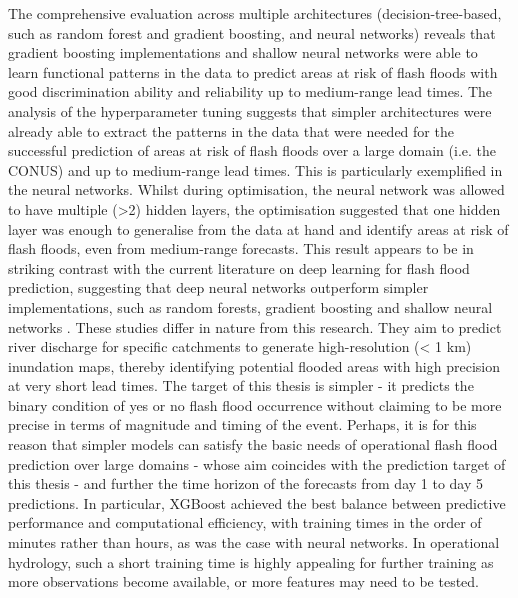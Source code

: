 The comprehensive evaluation across multiple architectures (decision-tree-based, such as random forest and gradient boosting, and neural networks) reveals that gradient boosting implementations and shallow neural networks were able to learn functional patterns in the data to predict areas at risk of flash floods with good discrimination ability and reliability up to medium-range lead times. The analysis of the hyperparameter tuning suggests that simpler architectures were already able to extract the patterns in the data that were needed for the successful prediction of areas at risk of flash floods over a large domain (i.e. the CONUS) and up to medium-range lead times. This is particularly exemplified in the neural networks. Whilst during optimisation, the neural network was allowed to have multiple (>2) hidden layers, the optimisation suggested that one hidden layer was enough to generalise from the data at hand and identify areas at risk of flash floods, even from medium-range forecasts. This result appears to be in striking contrast with the current literature on deep learning for flash flood prediction, suggesting that deep neural networks outperform simpler implementations, such as random forests, gradient boosting and shallow neural networks \citep{}. These studies differ in nature from this research. They aim to predict river discharge for specific catchments to generate high-resolution (< 1 km) inundation maps, thereby identifying potential flooded areas with high precision at very short lead times. The target of this thesis is simpler - it predicts the binary condition of yes or no flash flood occurrence without claiming to be more precise in terms of magnitude and timing of the event. Perhaps, it is for this reason that simpler models can satisfy the basic needs of operational flash flood prediction over large domains - whose aim coincides with the prediction target of this thesis \citep{Zanchetta_2020} - and further the time horizon of the forecasts from day 1 to day 5 predictions. In particular, XGBoost achieved the best balance between predictive performance and computational efficiency, with training times in the order of minutes rather than hours, as was the case with neural networks. In operational hydrology, such a short training time is highly appealing for further training as more observations become available, or more features may need to be tested. 

